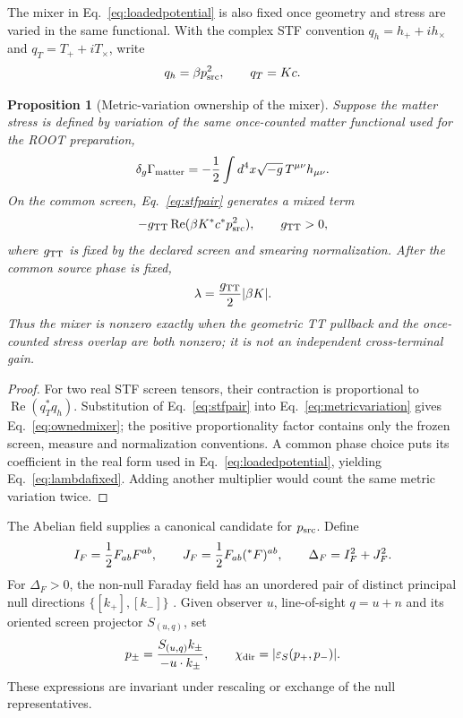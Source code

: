 \documentclass[11pt]{article}
\newtheorem{proposition}{Proposition}
\begin{document}
The mixer in Eq.~\eqref{eq:loadedpotential} is also fixed once geometry and
stress are varied in the same functional.  With the complex STF convention
$q_h=h_++ih_\times$ and $q_T=T_++iT_\times$, write
\begin{equation}
q_h=\beta p_{\rm src}^2,
\qquad q_T=Kc.
\label{eq:stfpair}
\end{equation}

\begin{proposition}[Metric-variation ownership of the mixer]
\label{prop:mixownership}
Suppose the matter stress is defined by variation of the same once-counted
matter functional used for the ROOT preparation,
\begin{equation}
\delta_g\Gamma_{\rm matter}
=-{1\over2}\int d^4x\sqrt{-g}\,T^{\mu\nu}h_{\mu\nu}.
\label{eq:metricvariation}
\end{equation}
On the common screen, Eq.~\eqref{eq:stfpair} generates a mixed term
\begin{equation}
-g_{\rm TT}\operatorname{Re}(\beta K^*c^*p_{\rm src}^2),
\qquad g_{\rm TT}>0,
\label{eq:ownedmixer}
\end{equation}
where $g_{\rm TT}$ is fixed by the declared screen and smearing
normalization.  After the common source phase is fixed,
\begin{equation}
\lambda={g_{\rm TT}\over2}|\beta K|.
\label{eq:lambdafixed}
\end{equation}
Thus the mixer is nonzero exactly when the geometric TT pullback and the
once-counted stress overlap are both nonzero; it is not an independent
cross-terminal gain.
\end{proposition}

\begin{proof}
For two real STF screen tensors, their contraction is proportional to
$\operatorname{Re}(q_T^*q_h)$.  Substitution of
Eq.~\eqref{eq:stfpair} into Eq.~\eqref{eq:metricvariation} gives
Eq.~\eqref{eq:ownedmixer}; the positive proportionality factor contains only
the frozen screen, measure and normalization conventions.  A common phase
choice puts its coefficient in the real form used in
Eq.~\eqref{eq:loadedpotential}, yielding Eq.~\eqref{eq:lambdafixed}.
Adding another multiplier would count the same metric variation twice.
\end{proof}

The Abelian field supplies a canonical candidate for $p_{\rm src}$.  Define
\begin{equation}
 I_F={1\over2}F_{ab}F^{ab},\qquad
 J_F={1\over2}F_{ab}({}^*F)^{ab},\qquad
 \Delta_F=I_F^2+J_F^2.
\label{eq:faradayinvariants}
\end{equation}
For $\Delta_F>0$, the non-null Faraday field has an unordered pair of
distinct principal null directions $\{[k_+],[k_-]\}$
\citep{WyllemanCostaNatario2020}.  Given observer $u$, line-of-sight
$q=u+n$ and its oriented screen projector $S_{(u,q)}$, set
\begin{equation}
p_\pm={S_{(u,q)}k_\pm\over-u\cdot k_\pm},\qquad
\chi_{\rm dir}=|\varepsilon_S(p_+,p_-)|.
\label{eq:directionallift}
\end{equation}
These expressions are invariant under rescaling or exchange of the null
representatives.
\end{document}
